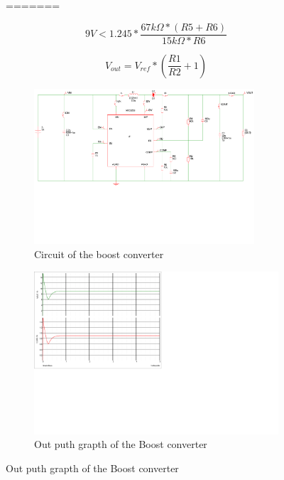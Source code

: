 \documentclass[11pt, titlepage]{article} %
\begin{document}
\begin{figure}
=======

\begin{equation}
	9V < 1.245 * \frac{67k \Omega * (R5 + R6) }{15k \Omega * R6}	
	\label{eq:ovp} 	
\end{equation}

\begin{equation}
	V_{out} = V_{ref} * (\frac{R1}{R2} + 1)
	\label{eq:vout}
\end{equation}



\begin{figure}
	\includegraphics[width=0.9\textwidth]{boost_converter_curcuit.pdf}
	\caption{Circuit of the boost converter}
	\label{fig:circuit_boost_converter}
\end{figure}

\begin{figure}
	\includegraphics{graph_of_boost_out.png}
	\caption{Out puth grapth of the Boost converter}
	\label{fig:graph_boost}
\end{figure}


\end{figure}
\end{document}

